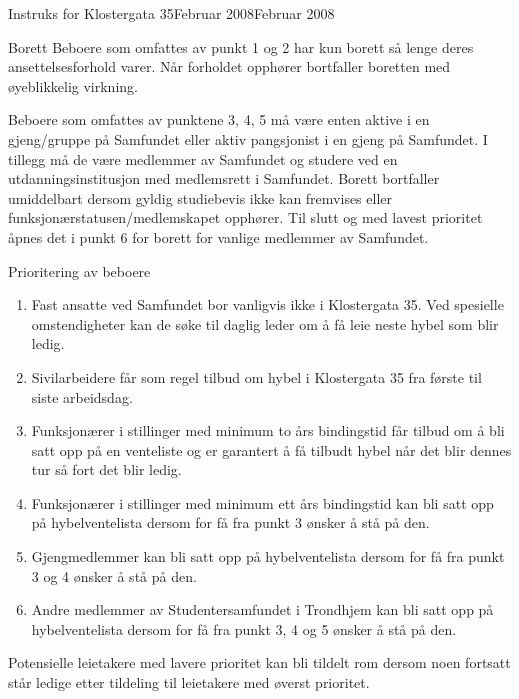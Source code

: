 \begin{instruks}{Instruks for Klostergata 35}{Februar 2008}{Februar 2008}
\begin{instruksledd}{Borett}
        Beboere som omfattes av punkt 1 og 2 har kun borett så lenge deres
        ansettelsesforhold varer. Når forholdet opphører
        bortfaller boretten med øyeblikkelig virkning.
        
        Beboere som omfattes av punktene 3, 4, 5 må være enten aktive i en gjeng/gruppe på
        Samfundet eller aktiv
        pangsjonist i en gjeng på Samfundet. I tillegg må de være medlemmer av Samfundet
        og studere ved en
        utdanningsinstitusjon med medlemsrett i Samfundet. Borett bortfaller umiddelbart
        dersom gyldig studiebevis ikke kan
        fremvises eller funksjonærstatusen/medlemskapet opphører. Til slutt og med lavest
        prioritet åpnes det i punkt 6 for
        borett for vanlige medlemmer av Samfundet.
    \end{instruksledd}

    \begin{instruksledd}{Prioritering av beboere}
        \begin{enumerate}
            \item Fast ansatte ved Samfundet bor vanligvis ikke i Klostergata 35. Ved spesielle
                omstendigheter kan de
                søke til daglig leder om å få leie neste hybel som blir ledig.
            \item Sivilarbeidere får som regel tilbud om hybel i Klostergata 35 fra første til
                siste arbeidsdag.
            \item  Funksjonærer i stillinger med minimum to års bindingstid får tilbud om å bli
                satt opp på en venteliste og
                er garantert å få tilbudt hybel når det blir dennes tur så fort det blir ledig.
            \item Funksjonærer i stillinger med minimum ett års bindingstid kan bli satt opp på
                hybelventelista dersom for
                få fra punkt 3 ønsker å stå på den.
            \item Gjengmedlemmer kan bli satt opp på hybelventelista dersom for få fra punkt 3 og 4
                ønsker å stå på den.
            \item Andre medlemmer av Studentersamfundet i Trondhjem kan bli satt opp på
                hybelventelista dersom for få fra punkt 3, 4 og 5 ønsker å stå på den.
        \end{enumerate}

        Potensielle leietakere med lavere prioritet kan bli tildelt rom dersom noen
        fortsatt står ledige etter tildeling til
        leietakere med øverst prioritet.
    \end{instruksledd}


\end{instruks}
